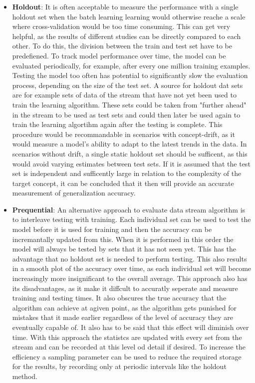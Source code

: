 \documentclass[12pt,oneside,a4paper,parskip]{scrbook}
\begin{document}
\begin{itemize}
  \item \textbf{Holdout}:
        It is often acceptable to measure the performance with a single holdout set when the batch learning learning 
        would otherwise reache a scale where cross-validation would be too time consuming.
        This can get very helpful, as the results of different studies can be directly compared to each other. 
        To do this, the division between the train and test set have to be predefiened.
        To track model performance over time, the model can be evaluated periodically, for example, after every 
        one million training examples. Testing the model too often has potential to significantly slow the evaluation 
        process, depending on the size of the test set.
        A source for holdout dat sets are for example sets of data of the stream that have not yet been used to train 
        the learning algorithm.
        These sets could be taken from "further ahead" in the stream to be used as test sets and could then later be 
        used again to train the learning algortihm again after the testing is complete.
        This procedure would be recommandable in scenarios with concept-drift, as it would measure a model’s ability
        to adapt to the latest trends in the data.
        In scenarios without drift, a single static holdout set should be sufficent, as this would avoid varying estimates 
        between test sets.
        If it is assumed that the test set is independent and sufficently large in relation to the complexity of the 
        target concept, it can be concluded that it then will provide an accurate measurement of generalization accuracy.
        \cite{Bifet_datastream}
  \item \textbf{Prequential}:
        An alternative approach to evaluate data stream algorithm is to interleave testing with training. Each individual
        set can be used to test the model before it is used for training and then the accuracy can be incremantally updated
        from this. When it is performed in this order the model will always be tested by sets that it has not seen yet.
        This has the advantage that no holdout set is needed to perform testing. This also results in a smooth plot of 
        the accuracy over time, as each individual set will become increasingly more insignificant to the overall average.
        This approach also has its disadvantages, as it make it diffcult to accuratly seperate and measure
        training and testing times. It also obscures the true accuracy that the algorithm can achieve at agiven point, as the 
        algorithm gets punished for mistakes that it made earlier regardless of the level of accuracy they are eventually
        capable of. It also has to be said that this effect will diminish over time.
        With this approach the statistcs are updated with every set from the stream and can be recorded at this level od detail
        if desired. To increase the efficiency a sampling parameter can be used to reduce the required storage for the results,
        by recording only at periodic intervals like the holdout method.
        \cite{Bifet_datastream}
\end{itemize}
\end{document}
